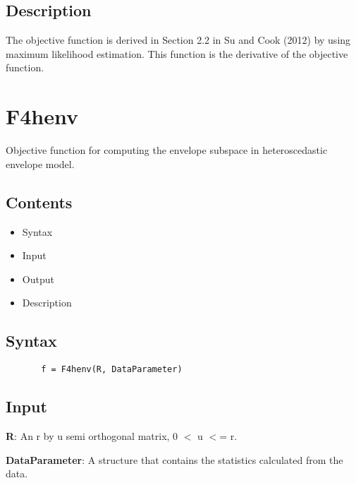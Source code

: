 \documentclass[a4paper,11pt,openany]{memoir}
\begin{document}
\subsection*{Description}

\begin{par}
The objective function is derived in Section 2.2 in Su and Cook (2012) by  using maximum likelihood estimation. This function is the derivative of  the objective function.
\end{par} \vspace{1em}

\newpage

\rmfamily
\color{black}\section{F4henv}

\begin{par}
Objective function for computing the envelope subspace in heteroscedastic envelope model.
\end{par} \vspace{1em}

\subsection*{Contents}

\begin{itemize}
\setlength{\itemsep}{-1ex}
   \item Syntax
   \item Input
   \item Output
   \item Description
\end{itemize}


\subsection*{Syntax}


\begin{verbatim}       f = F4henv(R, DataParameter)\end{verbatim}
    

\subsection*{Input}

\begin{par}
\textbf{R}: An r by u semi orthogonal matrix, 0 \ensuremath{<} u \ensuremath{<}= r.
\end{par} \vspace{1em}
\begin{par}
\textbf{DataParameter}: A structure that contains the statistics calculated from the data.
\end{par} \vspace{1em}
\end{document}
